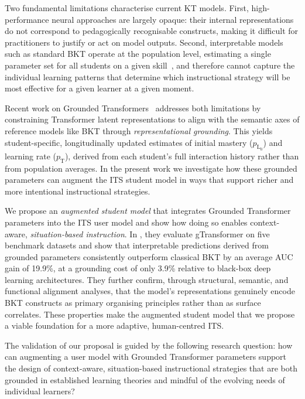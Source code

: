 \documentclass[runningheads]{llncs}
\begin{document}
Two fundamental limitations characterise current KT models. First, high-performance neural approaches are largely opaque: their internal representations do not correspond to pedagogically recognisable constructs, making it difficult for practitioners to justify or act on model outputs. Second, interpretable models such as standard BKT operate at the population level, estimating a single parameter set for all students on a given skill~\cite{yudelson2013individualized}, and therefore cannot capture the individual learning patterns that determine which instructional strategy will be most effective for a given learner at a given moment.

Recent work on Grounded Transformers~\cite{labra2026theory} addresses both limitations by constraining Transformer latent representations to align with the semantic axes of reference models like BKT through \textit{representational grounding}. This yields student-specific, longitudinally updated estimates of initial mastery ($p_{\text{L}_0}$) and learning rate ($p_{\text{T}}$), derived from each student's full interaction history rather than from population averages. In the present work we investigate how these grounded parameters can augment the ITS student model in ways that support richer and more intentional instructional strategies.

We propose an \textit{augmented student model} that integrates Grounded Transformer parameters into the ITS user model and show how doing so enables context-aware, \textit{situation-based instruction}. In \cite{labra2026theory}, they evaluate gTransformer on five benchmark datasets and show that interpretable predictions derived from grounded parameters consistently outperform classical BKT by an average AUC gain of 19.9\%, at a grounding cost of only 3.9\% relative to black-box deep learning architectures. They further confirm, through structural, semantic, and functional alignment analyses, that the model's representations genuinely encode BKT constructs as primary organising principles rather than as surface correlates. These properties make the augmented student model that we propose a viable foundation for a more adaptive, human-centred ITS. 

The validation of our proposal is guided by the following research question: how can augmenting a user model with Grounded Transformer parameters support the design of context-aware, situation-based instructional strategies that are both grounded in established learning theories and mindful of the evolving needs of individual learners?
\end{document}

